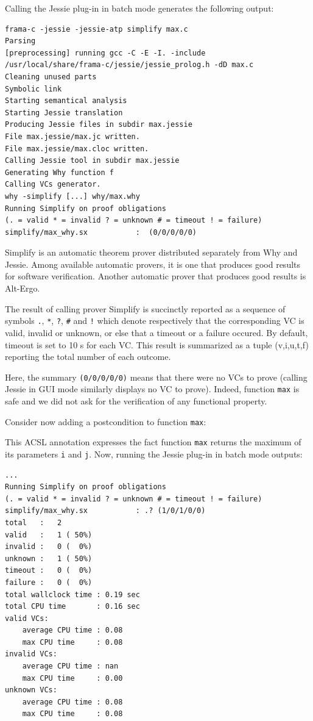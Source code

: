 \documentclass[a4paper,11pt,twoside,openright]{report}
\begin{document}


Calling the Jessie plug-in in batch mode generates the following output:

\begin{verbatim}
frama-c -jessie -jessie-atp simplify max.c
Parsing
[preprocessing] running gcc -C -E -I. -include
/usr/local/share/frama-c/jessie/jessie_prolog.h -dD max.c
Cleaning unused parts
Symbolic link
Starting semantical analysis
Starting Jessie translation
Producing Jessie files in subdir max.jessie
File max.jessie/max.jc written.
File max.jessie/max.cloc written.
Calling Jessie tool in subdir max.jessie
Generating Why function f
Calling VCs generator.
why -simplify [...] why/max.why
Running Simplify on proof obligations
(. = valid * = invalid ? = unknown # = timeout ! = failure)
simplify/max_why.sx           :  (0/0/0/0/0)
\end{verbatim}

Simplify is an automatic theorem prover distributed separately from Why
and Jessie. Among available automatic provers, it is one that
produces good results for software verification. Another automatic
prover that produces good results is Alt-Ergo.

The result of calling prover Simplify is succinctly reported as a
sequence of symbols \verb|.|, \verb|*|, \verb|?|, \verb|#| and
\verb|!| which denote respectively that the corresponding VC is valid,
invalid or unknown, or else that a timeout or a failure occured. By
default, timeout is set to 10 s for each VC. This result is summarized
as a tuple (v,i,u,t,f) reporting the total number of each outcome.

Here, the summary \verb|(0/0/0/0/0)| means that there were no VCs to prove
(calling Jessie in GUI mode similarly displays no VC to
prove). Indeed, function \verb|max| is safe and we did not ask for the
verification of any functional property.

Consider now adding a postcondition to function \verb|max|:



This ACSL annotation expresses the fact function \verb|max| returns
the maximum of its parameters \verb|i| and \verb|j|. Now, running the
Jessie plug-in in batch mode outputs:

\begin{verbatim}
...
Running Simplify on proof obligations
(. = valid * = invalid ? = unknown # = timeout ! = failure)
simplify/max_why.sx           : .? (1/0/1/0/0)
total   :   2
valid   :   1 ( 50%)
invalid :   0 (  0%)
unknown :   1 ( 50%)
timeout :   0 (  0%)
failure :   0 (  0%)
total wallclock time : 0.19 sec
total CPU time       : 0.16 sec
valid VCs:
    average CPU time : 0.08
    max CPU time     : 0.08
invalid VCs:
    average CPU time : nan
    max CPU time     : 0.00
unknown VCs:
    average CPU time : 0.08
    max CPU time     : 0.08
\end{verbatim}
\end{document}
